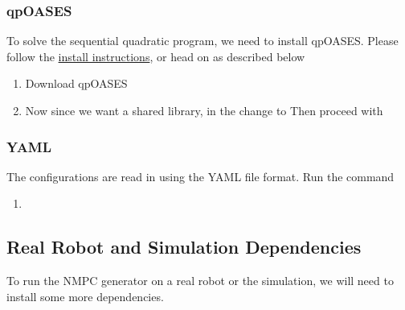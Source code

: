 \subsubsection{qpOASES}
To solve the sequential quadratic program, we need to install qpOASES. Please follow the \href{https://projects.coin-or.org/qpOASES/wiki/QpoasesInstallation}{install instructions}, or head on as described below
\begin{enumerate}
	\item Download qpOASES
	\newline {}
	\newline {}
	\newline {}
	\item Now since we want a shared library, in the  change 
	\newline {} to
	\newline {}
	\newline Then proceed with
	\newline {}
	\newline {}
	\newline {}
	\newline {}
\end{enumerate}
\subsubsection{YAML}
The configurations are read in using the YAML file format. Run the command
\begin{enumerate}
	\item {}
\end{enumerate}
\subsection{Real Robot and Simulation Dependencies}
\label{sec::A52_rs}
To run the NMPC generator on a real robot or the simulation, we will need to install some more dependencies.
